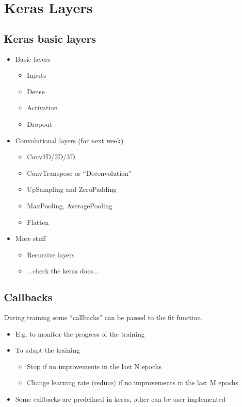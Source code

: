 \section{Keras Layers}
\subsection{Keras basic layers}

\begin{itemize}
	\item Basic layers
	\begin{itemize}
		\item Inputs
		\item Dense
		\item Activation
		\item Dropout
	\end{itemize}
	\item Convolutional layers (for next week)
	\begin{itemize}
		\item Conv1D/2D/3D
		\item ConvTranspose or “Deconvolution”
		\item UpSampling and ZeroPadding
		\item MaxPooling, AveragePooling
		\item Flatten
	\end{itemize}
	\item More stuff
	\begin{itemize}
		\item Recursive layers
		\item ...check the keras docs...
	\end{itemize}
\end{itemize}

\subsection{Callbacks}
During training some “callbacks” can be passed to the fit function.
\begin{itemize}
	\item E.g. to monitor the progress of the training
	\item To adapt the training
	\begin{itemize}
		\item Stop if no improvements in the last N epochs
		\item Change learning rate (reduce) if no improvements in the last M epochs
	\end{itemize}
	\item Some callbacks are predefined in keras, other can be user implemented
\end{itemize}

